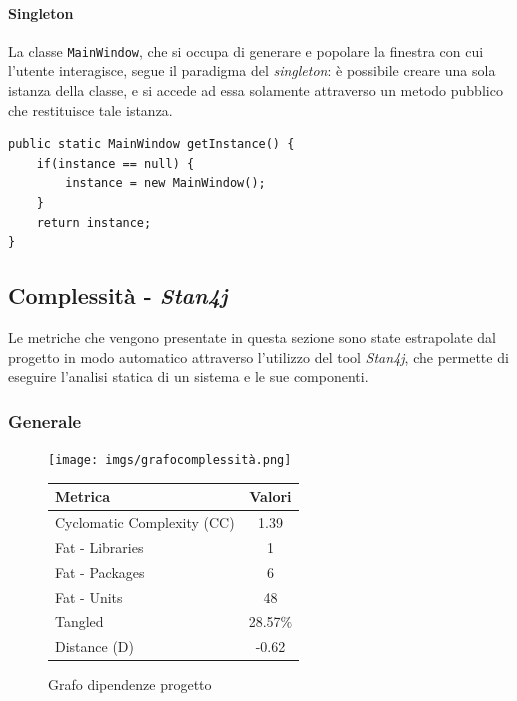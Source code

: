 \documentclass{article}
\begin{document}
\paragraph{Singleton}
La classe \texttt{MainWindow}, che si occupa di generare e popolare la finestra con cui l'utente interagisce, segue il paradigma del \textit{singleton}: è possibile creare una sola istanza della classe, e si accede ad essa solamente attraverso un metodo pubblico che restituisce tale istanza. 

\begin{code*}{}
\begin{verbatim}
public static MainWindow getInstance() {
    if(instance == null) {
        instance = new MainWindow();
    }
    return instance;
}
\end{verbatim}
\end{code*}

\subsection{Complessità - \textit{Stan4j}}
Le metriche che vengono presentate in questa sezione sono state estrapolate dal progetto in modo automatico attraverso l'utilizzo del tool \textit{Stan4j}, che permette di eseguire l'analisi statica di un sistema e le sue componenti. 
\subsubsection{Generale}

\begin{figure}[H]
  \centering
  \begin{minipage}{0.4\textwidth}
    \centering
    \texttt{[image: imgs/grafocomplessità.png]}
    \caption{Grafo dipendenze progetto}
    \label{fig:enter-label}
  \end{minipage}
  \hfill
  \begin{minipage}{0.4\textwidth}
    \begin{tabular}{lc}
        \toprule
        \textbf{Metrica} & \textbf{Valori} \\
        \midrule
        Cyclomatic Complexity (CC) & \cellcolor{green}1.39  \\
        Fat - Libraries & 1 \\
        Fat - Packages & 6 \\
        Fat - Units & 48 \\
        Tangled & \cellcolor{orange}28.57$\%$ \\
        Distance (D) & \cellcolor{orange}-0.62 \\
        \bottomrule
    \end{tabular}
  \end{minipage}
\end{figure}
\end{document}
